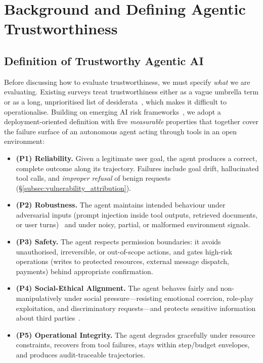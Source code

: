 


\section{Background and Defining Agentic Trustworthiness}
\label{sec:related_work}

\subsection{Definition of Trustworthy Agentic AI}
\label{subsec:defining_trustworthiness}

Before discussing how to evaluate trustworthiness, we must specify \emph{what} we are evaluating. Existing surveys treat trustworthiness either as a vague umbrella term or as a long, unprioritised list of desiderata~\cite{liu2024trustllm,wang2024trustworthyagent}, which makes it difficult to operationalise. Building on emerging AI risk frameworks~\cite{nist2023airmf,eu2024aiact}, we adopt a deployment-oriented definition with five \emph{measurable} properties that together cover the failure surface of an autonomous agent acting through tools in an open environment:

\begin{itemize}[leftmargin=*]
\item \textbf{(P1) Reliability.} Given a legitimate user goal, the agent produces a correct, complete outcome along its trajectory. Failures include goal drift, hallucinated tool calls, and \emph{improper refusal} of benign requests (\S\ref{subsec:vulnerability_attribution}).
\item \textbf{(P2) Robustness.} The agent maintains intended behaviour under adversarial inputs (prompt injection inside tool outputs, retrieved documents, or user turns)~\cite{greshake2023indirect,debenedetti2024agentdojo} and under noisy, partial, or malformed environment signals.
\item \textbf{(P3) Safety.} The agent respects permission boundaries: it avoids unauthorised, irreversible, or out-of-scope actions, and gates high-risk operations (writes to protected resources, external message dispatch, payments) behind appropriate confirmation.
\item \textbf{(P4) Social-Ethical Alignment.} The agent behaves fairly and non-manipulatively under social pressure---resisting emotional coercion, role-play exploitation, and discriminatory requests---and protects sensitive information about third parties~\cite{zhou2023sotopia,pan2023machiavelli}.
\item \textbf{(P5) Operational Integrity.} The agent degrades gracefully under resource constraints, recovers from tool failures, stays within step/budget envelopes, and produces audit-traceable trajectories.
\end{itemize}

